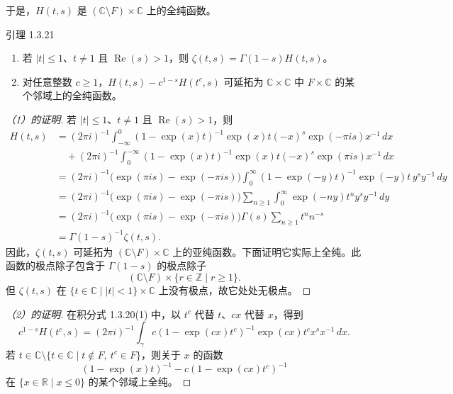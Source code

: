 于是，$H(t,s)$ 是 $(\mathbb C\setminus F)\times\mathbb C$ 上的全纯函数。

\begin{statement}{引理 1.3.21}
\begin{enumerate}[label=(\arabic*)]
\item 若 $|t|\leq1$、$t\ne1$ 且 $\operatorname{Re}(s)>1$，则
$\zeta(t,s)=\Gamma(1-s)H(t,s)$。
\item 对任意整数 $c\geq1$，$H(t,s)-c^{1-s}H(t^c,s)$ 可延拓为
$\mathbb C\times\mathbb C$ 中 $F\times\mathbb C$ 的某个邻域上的全纯函数。
\end{enumerate}
\end{statement}
\begin{proof}[（1）的证明]
若 $|t|\leq1$、$t\ne1$ 且 $\operatorname{Re}(s)>1$，则
\begin{align*}
H(t,s)
&=(2\pi i)^{-1}\int_{-\infty}^{0}
 (1-\exp(x)t)^{-1}\exp(x)t(-x)^s\exp(-\pi is)x^{-1}\,dx\\
&\quad +(2\pi i)^{-1}\int_{0}^{-\infty}
 (1-\exp(x)t)^{-1}\exp(x)t(-x)^s\exp(\pi is)x^{-1}\,dx\\
&=(2\pi i)^{-1}\bigl(\exp(\pi is)-\exp(-\pi is)\bigr)
 \int_0^\infty(1-\exp(-y)t)^{-1}\exp(-y)t\,y^s y^{-1}\,dy\\
&=(2\pi i)^{-1}\bigl(\exp(\pi is)-\exp(-\pi is)\bigr)
 \sum_{n\geq1}\int_0^\infty\exp(-ny)t^n y^s y^{-1}\,dy\\
&=(2\pi i)^{-1}\bigl(\exp(\pi is)-\exp(-\pi is)\bigr)
 \Gamma(s)\sum_{n\geq1}t^nn^{-s}\\
&=\Gamma(1-s)^{-1}\zeta(t,s).
\end{align*}
因此，$\zeta(t,s)$ 可延拓为 $(\mathbb C\setminus F)\times\mathbb C$ 上的亚纯函数。下面证明它实际上全纯。此函数的极点除子包含于 $\Gamma(1-s)$ 的极点除子
\[
(\mathbb C\setminus F)\times\{r\in\mathbb Z\mid r\geq1\}.
\]
但 $\zeta(t,s)$ 在 $\{t\in\mathbb C\mid |t|<1\}\times\mathbb C$ 上没有极点，故它处处无极点。
\end{proof}
\begin{proof}[（2）的证明]
在积分式 1.3.20(1) 中，以 $t^c$ 代替 $t$、$cx$ 代替 $x$，得到
\[
c^{1-s}H(t^c,s)=(2\pi i)^{-1}\int_\gamma
c(1-\exp(cx)t^c)^{-1}\exp(cx)t^c x^s x^{-1}\,dx.
\]
若 $t\in\mathbb C\setminus\{t\in\mathbb C\mid t\notin F,\ t^c\in F\}$，则关于 $x$ 的函数
\[
(1-\exp(x)t)^{-1}-c(1-\exp(cx)t^c)^{-1}
\]
在 $\{x\in\mathbb R\mid x\leq0\}$ 的某个邻域上全纯。
\end{proof}

